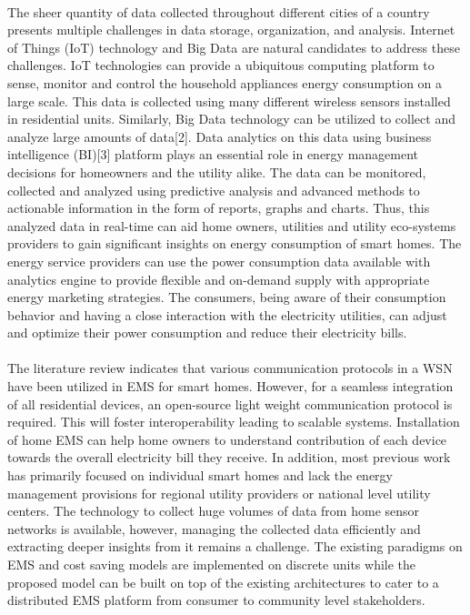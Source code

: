 \documentclass[a4paper,12pt,oneside]{article}
\begin{document}
\paragraph{}
The sheer quantity of data
collected throughout different cities of a country presents
multiple challenges in data storage, organization, and analysis.
Internet of Things (IoT) technology and Big Data are natural
candidates to address these challenges. IoT technologies can
provide a ubiquitous computing platform to sense, monitor
and control the household appliances energy consumption on a
large scale. This data is collected using many different
wireless sensors installed in residential units. Similarly, Big
Data technology can be utilized to collect and analyze large
amounts of data[2]. Data analytics on this data using business
intelligence (BI)[3] platform plays an essential role in energy
management decisions for homeowners and the utility alike.
The data can be monitored, collected and analyzed using
predictive analysis and advanced methods to actionable
information in the form of reports, graphs and charts. Thus,
this analyzed data in real-time can aid home owners, utilities
and utility eco-systems providers to gain significant insights
on energy consumption of smart homes. The energy service
providers can use the power consumption data available with
analytics engine to provide flexible and on-demand supply
with appropriate energy marketing strategies. The consumers,
being aware of their consumption behavior and having a close
interaction with the electricity utilities, can adjust and
optimize their power consumption and reduce their electricity
bills.
\paragraph{}
The literature review indicates that various communication
protocols in a WSN have been utilized in EMS for smart
homes. However, for a seamless integration of all residential
devices, an open-source light weight communication protocol
is required. This will foster interoperability leading to scalable
systems. Installation of home EMS can help home owners to
understand contribution of each device towards the overall
electricity bill they receive. In addition, most previous work
has primarily focused on individual smart homes and lack the
energy management provisions for regional utility providers or
national level utility centers. The technology to collect huge
volumes of data from home sensor networks is available,
however, managing the collected data efficiently and
extracting deeper insights from it remains a challenge. The
existing paradigms on EMS and cost saving models are
implemented on discrete units while the proposed model can
be built on top of the existing architectures to cater to a
distributed EMS platform from consumer to community level
stakeholders.
\end{document}
